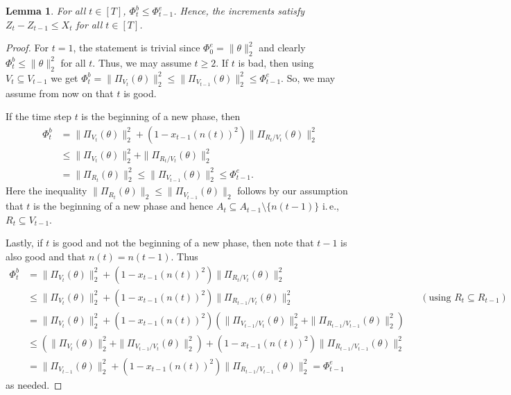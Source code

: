 \documentclass[11pt]{article}
\numberwithin{equation}{section}
\newtheorem{lemma}[theorem]{Lemma}
\theoremstyle{definition}
\theoremstyle{plain}
\newcommand{\ie}{i.\,e.}
\begin{document}
\begin{lemma}
\label{lem:freedrop}
For all $t \in [T]$, $\Phi^b_t \leq \Phi^e_{t-1}$. Hence, the increments satisfy $Z_t -Z_{t-1} \leq X_t$ for all $t \in [T]$.
\end{lemma}
\begin{proof}
For $t=1$, the statement is trivial since $\Phi^e_0 = \|\theta\|_2^2$ and
clearly $\Phi^b_t \leq \|\theta\|_2^2$ for all $t$. Thus, we may assume $t \geq 2$.
If $t$ is bad, then using $V_t \subseteq V_{t-1}$ we get $\Phi_{t}^b = \|\Pi_{V_{t}}(\theta)\|_2^2 \leq
\|\Pi_{V_{t-1}}(\theta)\|_2^2 \leq \Phi_{t-1}^e$. So, we may assume from now on that $t$ is good.

If the time step $t$ is the beginning of a new phase, then
\begin{align*}
\Phi^b_t &= \|\Pi_{V_t}(\theta)\|_2^2 + (1-x_{t-1}(n(t))^2) \|\Pi_{R_{t}/V_{t}}(\theta)\|_2^2 \\
         &\leq \|\Pi_{V_{t}}(\theta)\|_2^2 + \|\Pi_{R_{t}/V_{t}}(\theta)\|_2^2 \\
         &= \|\Pi_{R_t}(\theta)\|_2^2 \leq \|\Pi_{V_{t-1}}(\theta)\|_2^2 \leq \Phi^e_{t-1}.
\end{align*}
Here the inequality $\|\Pi_{R_{t}}(\theta)\|_2 \leq \|\Pi_{V_{t-1}}(\theta)\|_2$
follows by our assumption that $t$ is the beginning of a new phase and hence $A_t \subseteq A_{t-1} \setminus \{n(t-1)\}$ \ie, $R_{t} \subseteq V_{t-1}$.

Lastly, if $t$ is good and not the beginning of a new phase, then note that $t-1$ is also good and that $n(t) = n(t-1)$.  Thus
\begin{align*}
\Phi^b_t &= \|\Pi_{V_{t}}(\theta)\|_2^2 + (1-x_{t-1}(n(t))^2)\|\Pi_{R_{t}/V_{t}}(\theta)\|_2^2 \\
   &\leq \|\Pi_{V_{t}}(\theta)\|_2^2 + (1-x_{t-1}(n(t))^2)\|\Pi_{R_{t-1}/V_t}(\theta)\|_2^2
      && \left(\text{using } R_{t} \subseteq R_{t-1}\right) \\
    &= \|\Pi_{V_{t}}(\theta)\|_2^2 +
    (1-x_{t-1}(n(t))^2)\left(\|\Pi_{V_{t-1}/V_t}(\theta)\|_2^2 + \|\Pi_{R_{t-1}/V_{t-1}}(\theta)\|_2^2\right) \\
    &\leq \left(\|\Pi_{V_{t}}(\theta)\|_2^2 + \|\Pi_{V_{t-1}/V_{t}}(\theta)\|_2^2\right) +
          (1-x_{t-1}(n(t))^2) \|\Pi_{R_{t-1}/V_{t-1}}(\theta)\|_2^2 \\
    &= \|\Pi_{V_{t-1}}(\theta)\|_2^2 + (1-x_{t-1}(n(t))^2)
\|\Pi_{R_{t-1}/V_{t-1}}(\theta)\|_2^2 = \Phi_{t-1}^e
\end{align*}
as needed.
\end{proof}
\end{document}
